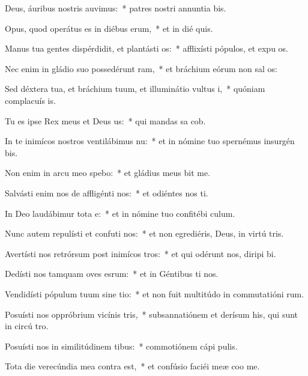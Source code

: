 \item Deus, áuribus nostris auvimus:~* patres nostri annuntia bis.
\item Opus, quod operátus es in diébus erum,~* et in dié quis.
\item Manus tua gentes dispérdidit, et plantásti os:~* afflixísti pópulos, et expu os.
\item Nec enim in gládio suo possedérunt ram,~* et bráchium eórum non sal os:
\item Sed déxtera tua, et bráchium tuum, et illuminátio vultus i,~* quóniam complacuís  is.
\item Tu es ipse Rex meus et Deus us:~* qui mandas sa cob.
\item In te inimícos nostros ventilábimus nu:~* et in nómine tuo spernémus insurgén  bis.
\item Non enim in arcu meo spebo:~* et gládius meus  bit me.
\item Salvásti enim nos de affligénti nos:~* et odiéntes nos ti.
\item In Deo laudábimur tota e:~* et in nómine tuo confitébi  culum.
\item Nunc autem repulísti et confuti nos:~* et non egrediéris, Deus, in virtú tris.
\item Avertísti nos retrórsum post inimícos tros:~* et qui odérunt nos, diripi bi.
\item Dedísti nos tamquam oves esrum:~* et in Géntibus ti nos.
\item Vendidísti pópulum tuum sine tio:~* et non fuit multitúdo in commutatióni rum.
\item Posuísti nos oppróbrium vicínis tris,~* subsannatiónem et derísum his, qui sunt in circú tro.
\item Posuísti nos in similitúdinem tibus:~* commotiónem cápi  pulis.
\item Tota die verecúndia mea contra  est,~* et confúsio faciéi meæ coo me.
